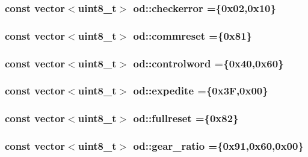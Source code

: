 \subsubsection[{\texorpdfstring{checkerror}{checkerror}}]{\setlength{\rightskip}{0pt plus 5cm}const vector$<$uint8\+\_\+t$>$ od\+::checkerror =\{0x02,0x10\}}\hypertarget{namespaceod_ac4b980a10ae256ea019a767459b6ba9b}{}\label{namespaceod_ac4b980a10ae256ea019a767459b6ba9b}
\subsubsection[{\texorpdfstring{commreset}{commreset}}]{\setlength{\rightskip}{0pt plus 5cm}const vector$<$uint8\+\_\+t$>$ od\+::commreset =\{0x81\}}\hypertarget{namespaceod_a75b2ed7fb6e21d4335334e1525fd223c}{}\label{namespaceod_a75b2ed7fb6e21d4335334e1525fd223c}
\subsubsection[{\texorpdfstring{controlword}{controlword}}]{\setlength{\rightskip}{0pt plus 5cm}const vector$<$uint8\+\_\+t$>$ od\+::controlword =\{0x40,0x60\}}\hypertarget{namespaceod_acb23d3cf4cdb0ce0c85a884a5a97ac00}{}\label{namespaceod_acb23d3cf4cdb0ce0c85a884a5a97ac00}
\subsubsection[{\texorpdfstring{expedite}{expedite}}]{\setlength{\rightskip}{0pt plus 5cm}const vector$<$uint8\+\_\+t$>$ od\+::expedite =\{0x3\+F,0x00\}}\hypertarget{namespaceod_ae572be966c7d5de90544f2ac32dbbd38}{}\label{namespaceod_ae572be966c7d5de90544f2ac32dbbd38}
\subsubsection[{\texorpdfstring{fullreset}{fullreset}}]{\setlength{\rightskip}{0pt plus 5cm}const vector$<$uint8\+\_\+t$>$ od\+::fullreset =\{0x82\}}\hypertarget{namespaceod_af9d6d0e820d6bc1ee375195e253f7b7b}{}\label{namespaceod_af9d6d0e820d6bc1ee375195e253f7b7b}
\subsubsection[{\texorpdfstring{gear\+\_\+ratio}{gear_ratio}}]{\setlength{\rightskip}{0pt plus 5cm}const vector$<$uint8\+\_\+t$>$ od\+::gear\+\_\+ratio =\{0x91,0x60,0x00\}}\hypertarget{namespaceod_af615192e30bab04a02f1aa4c21a48642}{}\label{namespaceod_af615192e30bab04a02f1aa4c21a48642}
